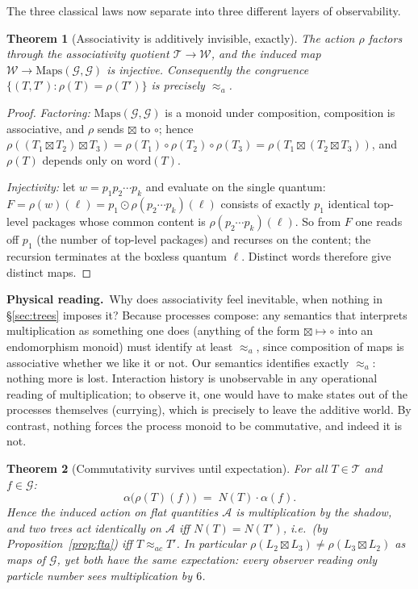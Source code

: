 \documentclass[11pt]{article}
\newcommand{\cT}{\mathcal{T}}   %
\newcommand{\cW}{\mathcal{W}}   %
\newcommand{\cG}{\mathcal{G}}   %
\newcommand{\cA}{\mathcal{A}}   %
\newcommand{\act}{\rho}
\newcommand{\physread}{\medskip\noindent\textbf{Physical reading.}\ }
\numberwithin{equation}{section}
\theoremstyle{plain}
\newtheorem{theorem}{Theorem}[section]
\theoremstyle{definition}
\theoremstyle{remark}
\begin{document}
The three classical laws now separate into three different layers of observability.

\begin{theorem}[Associativity is additively invisible, exactly]\label{thm:assoc}
The action $\act$ factors through the associativity quotient $\cT \to \cW$, and the
induced map $\cW \to \mathrm{Maps}(\cG,\cG)$ is injective. Consequently the congruence
$\{(T, T') : \act(T) = \act(T')\}$ is precisely $\approx_a$.
\end{theorem}

\begin{proof}
\emph{Factoring:} $\mathrm{Maps}(\cG,\cG)$ is a monoid under composition, composition
is associative, and $\act$ sends $\boxtimes$ to $\circ$; hence
$\act((T_1 \boxtimes T_2)\boxtimes T_3) = \act(T_1)\circ\act(T_2)\circ\act(T_3)
= \act(T_1 \boxtimes(T_2 \boxtimes T_3))$, and $\act(T)$ depends only on
$\mathrm{word}(T)$.

\emph{Injectivity:} let $w = p_1 p_2 \cdots p_k$ and evaluate on the single quantum:
$F = \act(w)(\ell) = p_1 \odot \act(p_2\cdots p_k)(\ell)$ consists of exactly $p_1$
identical top-level packages whose common content is $\act(p_2 \cdots p_k)(\ell)$.
So from $F$ one reads off $p_1$ (the number of top-level packages) and recurses on the
content; the recursion terminates at the boxless quantum $\ell$. Distinct words
therefore give distinct maps.
\end{proof}

\physread Why does associativity feel inevitable, when nothing in \S\ref{sec:trees}
imposes it? Because processes compose: any semantics that interprets
multiplication as something one does (anything of the form
$\boxtimes \mapsto \circ$ into an endomorphism monoid) must identify at least
$\approx_a$, since composition of maps is associative whether we like it or not. Our
semantics identifies exactly $\approx_a$: nothing more is lost. Interaction
history is unobservable in any operational reading of multiplication; to observe it,
one would have to make states out of the processes themselves (currying), which is
precisely to leave the additive world. By contrast, nothing forces the process monoid
to be commutative, and indeed it is not.

\begin{theorem}[Commutativity survives until expectation]\label{thm:shadowaction}
For all $T \in \cT$ and $f \in \cG$:
\[
\alpha\bigl(\act(T)(f)\bigr) \;=\; N(T)\cdot \alpha(f).
\]
Hence the induced action on flat quantities $\cA$ is multiplication by the shadow, and
two trees act identically on $\cA$ iff $N(T) = N(T')$, i.e.\ (by
Proposition~\ref{prop:fta}) iff $T \approx_{ac} T'$. In particular
$\act(L_2 \boxtimes L_3) \ne \act(L_3 \boxtimes L_2)$ as maps of $\cG$, yet both have
the same expectation: every observer reading only particle number sees
multiplication by $6$.
\end{theorem}
\end{document}
